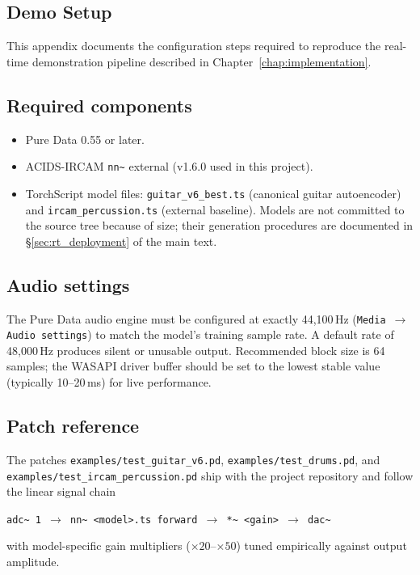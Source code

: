 \documentclass[a4paper,11pt,oneside,openany]{book}
\begin{document}
\begin{appendices}

\chapter{Demo Setup}\label{app:demo_setup}

This appendix documents the configuration steps required to reproduce the real-time demonstration pipeline described in Chapter~\ref{chap:implementation}.

\section{Required components}
\begin{itemize}
\item Pure Data 0.55 or later.
\item ACIDS-IRCAM \texttt{nn\textasciitilde} external (v1.6.0 used in this project).
\item TorchScript model files: \texttt{guitar\_v6\_best.ts} (canonical guitar autoencoder) and \texttt{ircam\_percussion.ts} (external baseline). Models are not committed to the source tree because of size; their generation procedures are documented in \S\ref{sec:rt_deployment} of the main text.
\end{itemize}

\section{Audio settings}
The Pure Data audio engine must be configured at exactly 44,100\,Hz (\texttt{Media $\rightarrow$ Audio settings}) to match the model's training sample rate. A default rate of 48,000\,Hz produces silent or unusable output. Recommended block size is 64 samples; the WASAPI driver buffer should be set to the lowest stable value (typically 10--20\,ms) for live performance.

\section{Patch reference}
The patches \texttt{examples/test\_guitar\_v6.pd}, \texttt{examples/test\_drums.pd}, and \texttt{examples/test\_ircam\_percussion.pd} ship with the project repository and follow the linear signal chain
\begin{center}
{\footnotesize\texttt{adc\textasciitilde\ 1 $\rightarrow$ nn\textasciitilde\ <model>.ts forward $\rightarrow$ *\textasciitilde\ <gain> $\rightarrow$ dac\textasciitilde}}
\end{center}
with model-specific gain multipliers ($\times 20$--$\times 50$) tuned empirically against output amplitude.


\end{appendices}
\end{document}
